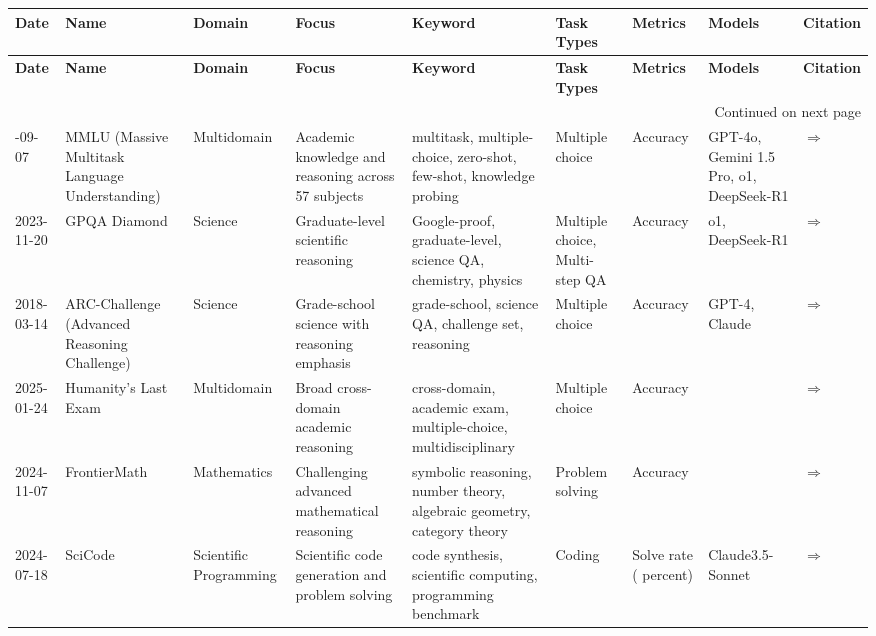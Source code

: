 \documentclass{article}
\begin{document}
\begin{landscape}
{\footnotesize
\begin{longtable}{|p{1.5cm}|p{2.5cm}|p{2cm}|p{2cm}|p{2.5cm}|p{3cm}|p{2cm}|p{2cm}|p{1cm}|}
\hline
{\bf Date} & {\bf Name} & {\bf Domain} & {\bf Focus} & {\bf Keyword} & {\bf Task Types} & {\bf Metrics} & {\bf Models} & {\bf Citation} \\ \hline
\endfirsthead
\hline
{\bf Date} & {\bf Name} & {\bf Domain} & {\bf Focus} & {\bf Keyword} & {\bf Task Types} & {\bf Metrics} & {\bf Models} & {\bf Citation} \\ \hline
\endhead
\hline
\multicolumn{9}{r}{Continued on next page} \\
\endfoot
\hline
\endlastfoot
2020-09-07 & MMLU (Massive Multitask Language Understanding) & Multidomain & Academic knowledge and reasoning across 57 subjects & multitask, multiple-choice, zero-shot, few-shot, knowledge probing & Multiple choice & Accuracy & GPT-4o, Gemini 1.5 Pro, o1, DeepSeek-R1 & \cite{hendrycks2021measuring} \href{https://arxiv.org/abs/2009.03300}{$\Rightarrow$ } \\ \hline
2023-11-20 & GPQA Diamond & Science & Graduate-level scientific reasoning & Google-proof, graduate-level, science QA, chemistry, physics & Multiple choice, Multi-step QA & Accuracy & o1, DeepSeek-R1 & \cite{rein2023gpqagraduatelevelgoogleproofqa} \href{https://arxiv.org/abs/2311.12022}{$\Rightarrow$ } \\ \hline
2018-03-14 & ARC-Challenge (Advanced Reasoning Challenge) & Science & Grade-school science with reasoning emphasis & grade-school, science QA, challenge set, reasoning & Multiple choice & Accuracy & GPT-4, Claude & \cite{clark2018think} \href{https://allenai.org/data/arc}{$\Rightarrow$ } \\ \hline
2025-01-24 & Humanity's Last Exam & Multidomain & Broad cross-domain academic reasoning & cross-domain, academic exam, multiple-choice, multidisciplinary & Multiple choice & Accuracy &  & \cite{phan2025humanitys} \href{https://arxiv.org/abs/2501.14249}{$\Rightarrow$ } \\ \hline
2024-11-07 & FrontierMath & Mathematics & Challenging advanced mathematical reasoning & symbolic reasoning, number theory, algebraic geometry, category theory & Problem solving & Accuracy &  & \cite{glazer2024frontiermath} \href{https://arxiv.org/abs/2411.04872}{$\Rightarrow$ } \\ \hline
2024-07-18 & SciCode & Scientific Programming & Scientific code generation and problem solving & code synthesis, scientific computing, programming benchmark & Coding & Solve rate ( percent) & Claude3.5-Sonnet & \cite{tian2024scicode} \href{https://arxiv.org/abs/2407.13168}{$\Rightarrow$ } \\ \hline

\end{longtable}}
\end{landscape}
\end{document}
